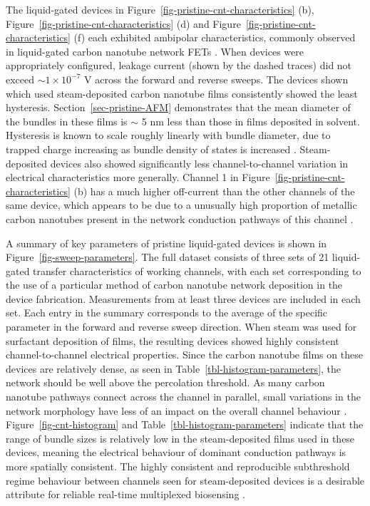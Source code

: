 \documentclass[
  a4paper,
]{scrbook}
\begin{document}
The liquid-gated devices in
Figure~\ref{fig-pristine-cnt-characteristics} (b),
Figure~\ref{fig-pristine-cnt-characteristics} (d) and
Figure~\ref{fig-pristine-cnt-characteristics} (f) each exhibited
ambipolar characteristics, commonly observed in liquid-gated carbon
nanotube network FETs
\autocite{Kauffman2008,Heller2009,JongYu2009,Derenskyi2014,Murugathas2018,Albarghouthi2022}.
When devices were appropriately configured, leakage current (shown by
the dashed traces) did not exceed \(\sim 1 \times 10^{-7}\) V across the
forward and reverse sweeps. The devices shown which used steam-deposited
carbon nanotube films consistently showed the least hysteresis.
Section~\ref{sec-pristine-AFM} demonstrates that the mean diameter of
the bundles in these films is \(\sim\) 5 nm less than those in films
deposited in solvent. Hysteresis is known to scale roughly linearly with
bundle diameter, due to trapped charge increasing as bundle density of
states is increased \autocite{Pop2009}. Steam-deposited devices also
showed significantly less channel-to-channel variation in electrical
characteristics more generally. Channel 1 in
Figure~\ref{fig-pristine-cnt-characteristics} (b) has a much higher
off-current than the other channels of the same device, which appears to
be due to a unusually high proportion of metallic carbon nanotubes
present in the network conduction pathways of this channel
\autocite{Rouhi2011,Zaumseil2015}.

A summary of key parameters of pristine liquid-gated devices is shown in
Figure~\ref{fig-sweep-parameters}. The full dataset consists of three
sets of 21 liquid-gated transfer characteristics of working channels,
with each set corresponding to the use of a particular method of carbon
nanotube network deposition in the device fabrication. Measurements from
at least three devices are included in each set. Each entry in the
summary corresponds to the average of the specific parameter in the
forward and reverse sweep direction. When steam was used for surfactant
deposition of films, the resulting devices showed highly consistent
channel-to-channel electrical properties. Since the carbon nanotube
films on these devices are relatively dense, as seen in
Table~\ref{tbl-histogram-parameters}, the network should be well above
the percolation threshold. As many carbon nanotube pathways connect
across the channel in parallel, small variations in the network
morphology have less of an impact on the overall channel behaviour
\autocite{Murugathas2018}. Figure~\ref{fig-cnt-histogram} and
Table~\ref{tbl-histogram-parameters} indicate that the range of bundle
sizes is relatively low in the steam-deposited films used in these
devices, meaning the electrical behaviour of dominant conduction
pathways is more spatially consistent. The highly consistent and
reproducible subthreshold regime behaviour between channels seen for
steam-deposited devices is a desirable attribute for reliable real-time
multiplexed biosensing \autocite{Kauffman2008,Heller2009,Gao2010}.
\end{document}

